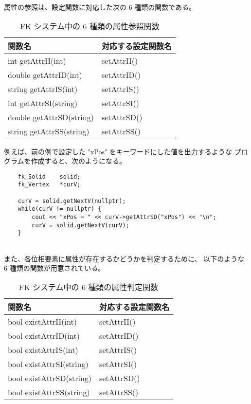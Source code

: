 属性の参照は、設定関数に対応した次の 6 種類の関数である。

\begin{table}[H]
\caption{FK システム中の 6 種類の属性参照関数}
\label{tbl:attr2}
\begin{center}
\begin{tabular}{|l|l|}
\hline
関数名 & 対応する設定関数名 \\ \hline
int getAttrII(int)		& setAttrII()	\\ \hline
double getAttrID(int)		& setAttrID()	\\ \hline
string getAttrIS(int)		& setAttrIS()	\\ \hline
int getAttrSI(string)		& setAttrSI()	\\ \hline
double getAttrSD(string)	& setAttrSD()	\\ \hline
string getAttrSS(string)	& setAttrSS()	\\ \hline
\end{tabular}
\end{center}
\end{table}

例えば、前の例で設定した "xPos" をキーワードにした値を出力するような
プログラムを作成すると、次のようになる。
\\
\begin{breakbox}
\begin{verbatim}
    fk_Solid    solid;
    fk_Vertex   *curV;

    curV = solid.getNextV(nullptr);
    while(curV != nullptr) {
        cout << "xPos = " << curV->getAttrSD("xPos") << "\n";
        curV = solid.getNextV(curV);
    }
\end{verbatim}
\end{breakbox}
~ \\
また、各位相要素に属性が存在するかどうかを判定するために、
以下のような 6 種類の関数が用意されている。

\begin{table}[H]
\caption{FK システム中の 6 種類の属性判定関数}
\label{tbl:attr3}
\begin{center}
\begin{tabular}{|l|l|}
\hline
関数名 & 対応する設定関数名 \\ \hline
bool existAttrII(int)		& setAttrII()	\\ \hline
bool existAttrID(int)		& setAttrID()	\\ \hline
bool existAttrIS(int)		& setAttrIS()	\\ \hline
bool existAttrSI(string)	& setAttrSI()	\\ \hline
bool existAttrSD(string)	& setAttrSD()	\\ \hline
bool existAttrSS(string)	& setAttrSS()	\\ \hline
\end{tabular}
\end{center}
\end{table}

